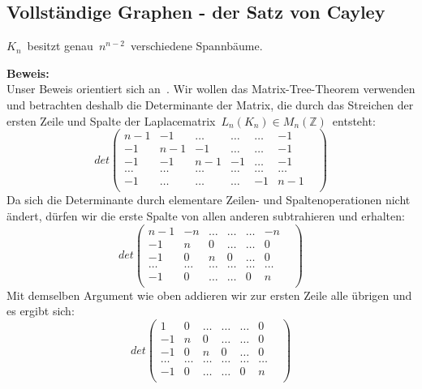 \subsection{Vollständige Graphen - der Satz von Cayley}
\begin{Tms}
$K_n\,$ besitzt genau $\,n^{n-2}\,$ verschiedene Spannbäume.\\
\end{Tms}
\textbf{Beweis:}\\
Unser Beweis orientiert sich an~\cite{Lau_2004}. Wir wollen das Matrix-Tree-Theorem verwenden und betrach\-ten deshalb die Determinante der Matrix, die durch das Streichen der ersten Zeile und Spalte der Laplacematrix $\,L_n(K_n)\in M_n(\mathbb{Z})\,$ entsteht:
\begin{equation}
det
\begin{pmatrix}
n-1&-1&\ldots&\ldots&\ldots&-1\\
-1&n-1&-1&\ldots&\ldots&-1\\
-1&-1&n-1&-1&\ldots&-1\\
\ldots&\ldots&\ldots&\ldots&\ldots&\ldots&\\
-1&\ldots&\ldots&\ldots&-1&n-1\\
\end{pmatrix}
\end{equation}
Da sich die Determinante durch elementare Zeilen- und Spaltenoperationen nicht ändert, dürfen wir die erste Spalte von allen anderen subtrahieren und erhalten:
\begin{equation}det
\begin{pmatrix}
n-1&-n&\ldots&\ldots&\ldots&-n\\
-1&n&0&\ldots&\ldots&0\\
-1&0&n&0&\ldots&0\\
\ldots&\ldots&\ldots&\ldots&\ldots&\ldots&\\
-1&0&\ldots&\ldots&0&n\\
\end{pmatrix}
\end{equation}
Mit demselben Argument wie oben addieren wir zur ersten Zeile alle übrigen und es ergibt sich:
\begin{equation}
det
\begin{pmatrix}
1&0&\ldots&\ldots&\ldots&0\\
-1&n&0&\ldots&\ldots&0\\
-1&0&n&0&\ldots&0\\
\ldots&\ldots&\ldots&\ldots&\ldots&\ldots&\\
-1&0&\ldots&\ldots&0&n\\
\end{pmatrix}
\end{equation}
